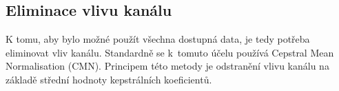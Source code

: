 
\subsection{Eliminace vlivu kanálu}
\label{chap:realisation:corpus:elimination}


K tomu, aby bylo možné použít všechna dostupná data, je tedy potřeba eliminovat vliv kanálu.
Standardně se  k~tomuto účelu používá Cepstral Mean Normalisation (CMN). Principem této metody je odstranění vlivu kanálu na základě střední hodnoty kepstrálních koeficientů.



